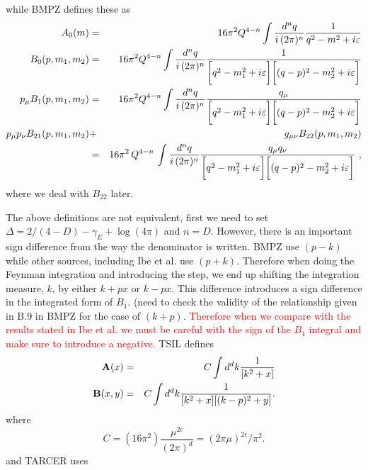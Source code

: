 \documentclass[11pt]{article}
\begin{document}
while BMPZ defines these as
\begin{eqnarray}
A_0(m) &=& 16\pi^2Q^{4-n}\int{d^nq\over i\,(2\pi)^n}{1\over
q^2-m^2+i\varepsilon}\\
B_0(p, m_1, m_2) &=&
16\pi^2Q^{4-n}\int{d^nq\over i\,(2\pi)^n}
{1\over\biggl[q^2-m^2_1+i\varepsilon\biggr]\biggl[
(q-p)^2-m_2^2+i\varepsilon\biggr]}
\label{B0 def}  \\
p_\mu B_1(p, m_1,m_2) &=& 16\pi^2Q^{4-n}\int
{d^nq\over i\,(2\pi)^n}{q_\mu\over\biggl[q^2-m^2_1+i\varepsilon\biggr]
\biggl[(q-p)^2-m_2^2+i\varepsilon\biggr]}\label{B1 def} \\ p_\mu p_\nu
B_{21}(p,m_1,m_2) &+& g_{\mu\nu}B_{22}(p,m_1,m_2)
\label{B22 def}\\
 &=& 16\pi^2\,Q^{4-n}\,\int{d^nq\over i\,(2\pi)^n} {q_\mu
q_\nu\over\biggl[q^2-m^2_1+i\varepsilon\biggr]\biggl[
(q-p)^2-m_2^2+i\varepsilon\biggr]}\ , \nonumber
\end{eqnarray}
where we deal with $B_{22}$ later.  

The above definitions are not equivalent, first we need to set $\Delta = 2/(4-D)-\gamma_E+\log(4\pi)$ and $n=D$.  However, there is an important sign difference from the way the denominator is written.  BMPZ use $(p-k)$ while other sources, including Ibe et al. use $(p+k)$.  Therefore when doing the Feynman integration and introducing the step, we end up shifting the integration measure, $k$, by either $k+px$ or $k-px$.  This difference introduces a sign difference in the integrated form of $B_1$.  (need to check the validity of the relationship given in B.9 in BMPZ for the case of $(k+p)$.  \textcolor{red}{Therefore when we compare with the results stated in Ibe et al. we must be careful with the sign of the $B_1$ integral and make sure to introduce a negative.}
TSIL defines
\begin{eqnarray}
{\bf A}(x) &=&  
C \int d^d k \frac{1}{[k^2 +x]}  %
\label{defineboldA}
\\
{\bf B}(x,y) &=&
C \int d^d k   \frac{1}{[k^2 +x] [(k-p)^2 +y]} .
\label{defineboldB}
\end{eqnarray}
where
\begin{equation}
C = (16 \pi^2) \frac{\mu^{2\epsilon}}{(2 \pi)^d}
  = (2 \pi \mu)^{2 \epsilon}/\pi^2 .
\end{equation}
and TARCER uses
\end{document}
